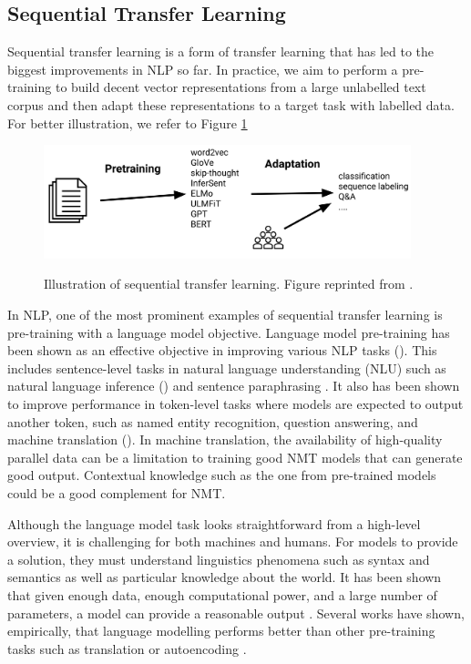 \subsection{Sequential Transfer Learning}
Sequential transfer learning is a form of transfer learning that has led to the biggest improvements in NLP so far. In practice, we aim to perform a pre-training to build decent vector representations from a large unlabelled text corpus and then adapt these representations to a target task with labelled data. For better illustration, we refer to Figure \ref{img:seq_tl}

\begin{figure}[h]
    {\includegraphics[width=0.95\textwidth]{img/sequential_tl.png}}
    \centering
    \caption{Illustration of sequential transfer learning. Figure reprinted from \cite{ruder2019transfer}.}
    \label{img:seq_tl}
\end{figure}

In NLP, one of the most prominent examples of sequential transfer learning is pre-training with a language model objective. Language model pre-training has been shown as an effective objective in improving various NLP tasks (\cite{Dai2015SemisupervisedSL,Peters2018DeepCW,Radford2018ImprovingLU,Howard2018UniversalLM}). This includes sentence-level tasks in natural language understanding (NLU) such as natural language inference (\cite{Bowman2015ALA,Williams2018ABC}) and sentence paraphrasing \cite{Dolan2005AutomaticallyCA}. It also has been shown to improve performance in token-level tasks where models are expected to output another token, such as named entity recognition, question answering, and machine translation (\cite{Sang2003IntroductionTT,Rajpurkar2016SQuAD1Q}). In machine translation, the availability of high-quality parallel data can be a limitation to training good NMT models that can generate good output. Contextual knowledge such as the one from pre-trained models could be a good complement for NMT.

Although the language model task looks straightforward from a high-level overview, it is challenging for both machines and humans. For models to provide a solution, they must understand linguistics phenomena such as syntax and semantics as well as particular knowledge about the world. It has been shown that given enough data, enough computational power, and a large number of parameters, a model can provide a reasonable output \cite{radford2018improving}. Several works have shown, empirically, that language modelling performs better than other pre-training tasks such as translation or autoencoding \cite{Zhang2018LanguageMT,Wang2019CanYT}.

